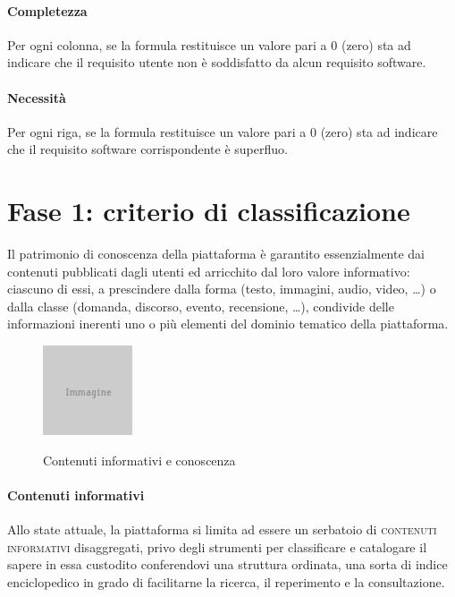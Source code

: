 \paragraph{Completezza} Per ogni colonna, se la formula restituisce un valore pari a 0 (zero) sta ad indicare che il requisito utente non è soddisfatto da alcun requisito software.

\paragraph{Necessità} Per ogni riga, se la formula restituisce un valore pari a 0 (zero) sta ad indicare che il requisito software corrispondente è superfluo.

\section{Fase 1: criterio di classificazione}
\label{sec:tesi:stage:fase-1}
Il patrimonio di conoscenza della piattaforma è garantito essenzialmente dai contenuti pubblicati dagli utenti ed arricchito dal loro valore informativo: ciascuno di essi, a prescindere dalla forma (testo, immagini, audio, video, \ldots) o dalla classe (domanda, discorso, evento, recensione, \ldots), condivide delle informazioni inerenti uno o più elementi del dominio tematico della piattaforma.

\begin{figure}[ht]
\begin{center}
 \includegraphics{placeholder.png}
 \label{fig:tesi:stage:classificazione:serbatoio-contenuti}
 \caption{Contenuti informativi e conoscenza}
\end{center}
\end{figure}

\paragraph{Contenuti informativi}
Allo state attuale, la piattaforma si limita ad essere un serbatoio di \textsc{contenuti informativi} disaggregati, privo degli strumenti per classificare e catalogare il sapere in essa custodito conferendovi una struttura ordinata, una sorta di indice enciclopedico in grado di facilitarne la ricerca, il reperimento e la consultazione.

